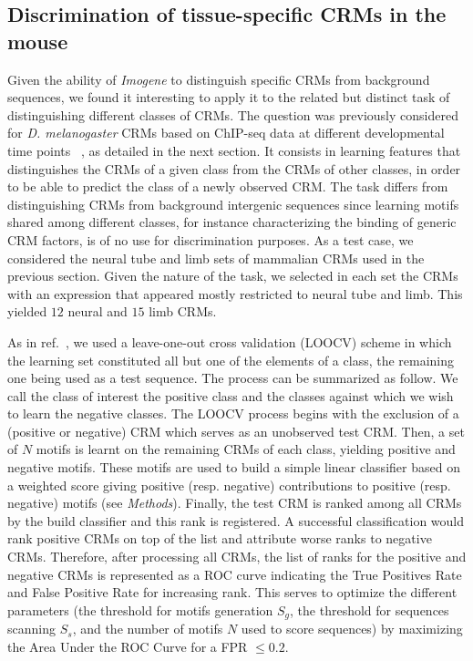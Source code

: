 \documentclass[a4,center,fleqn]{NAR}
\begin{document}
\subsection*{Discrimination of tissue-specific CRMs in the mouse}
Given the ability of {\em Imogene}  to distinguish specific CRMs from
background sequences, we found it interesting to apply it to the related but
distinct task  of distinguishing different classes of CRMs.
The question  was previously considered for {\em D. melanogaster} CRMs based on
ChIP-seq data at different developmental time points ~\cite{pmid19890324}, as
detailed in the next section.
It consists in learning features that distinguishes the CRMs of a given class
from the CRMs of other classes, in order to be able to predict the class of
a newly observed CRM.
The task differs from distinguishing CRMs from background intergenic sequences
since learning motifs shared among different classes, for instance
characterizing the binding of generic CRM factors, is of no use for
discrimination purposes.
As a test case, we considered the neural tube and limb sets of mammalian CRMs
used in the previous section. Given the nature of the task, we selected in each
set the CRMs with an expression that appeared mostly restricted to neural tube
and limb.
This yielded $12$  neural and $15$  limb CRMs.

As in ref.~\cite{pmid19890324}, we used a leave-one-out cross validation
(LOOCV) scheme in which the learning set constituted all but one of the
elements of a class, the remaining one being used as a test sequence. 
The process can be summarized as follow. 
We call the class of interest the positive class and the classes against which
we wish to learn the negative classes.
The LOOCV process begins with the exclusion of a (positive or negative) CRM
which serves as an unobserved test CRM. Then,  a set of $N$ motifs is learnt on
the remaining CRMs of each class, yielding positive and negative motifs.
These motifs are used to build a simple linear classifier  based on a weighted
score giving positive (resp. negative) contributions to positive (resp.
negative) motifs (see {\em Methods}).
Finally, the test CRM is ranked among all CRMs by the build classifier and this
rank is registered.
A successful classification would  rank positive CRMs  on top of the list and
attribute  worse ranks to negative CRMs.
Therefore, after processing  all CRMs, the list of ranks for the positive and
negative CRMs is represented as a ROC curve indicating the True Positives Rate
and False Positive Rate for increasing rank.
This serves to optimize the different parameters (the threshold for motifs
generation $S_g$, the threshold for sequences scanning $S_s$, and the number of
motifs $N$ used to score sequences) by maximizing the Area Under the ROC Curve
for a FPR $\leq 0.2$.
\end{document}
